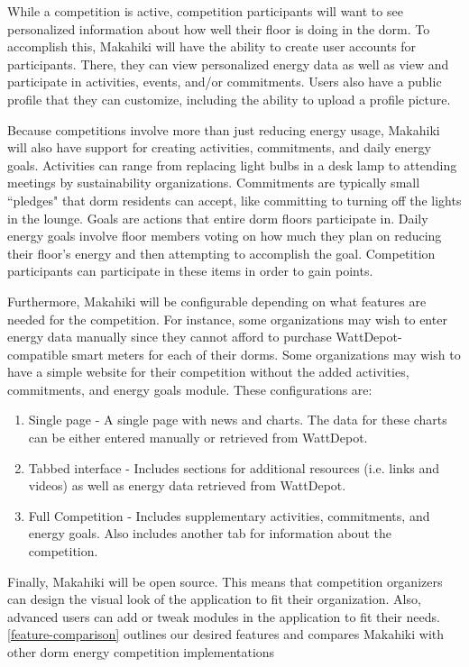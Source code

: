 While a competition is active, competition participants will want to see personalized information about how well their floor is doing in the dorm.  To accomplish this, Makahiki will have the ability to create user accounts for participants.  There, they can view personalized energy data as well as view and participate in activities, events, and/or commitments.  Users also have a public profile that they can customize, including the ability to upload a profile picture.

Because competitions involve more than just reducing energy usage, Makahiki will also have support for creating activities, commitments, and daily energy goals.  Activities can range from replacing light bulbs in a desk lamp to attending meetings by sustainability organizations.  Commitments are typically small ``pledges" that dorm residents can accept, like committing to turning off the lights in the lounge.  Goals are actions that entire dorm floors participate in.  Daily energy goals involve floor members voting on how much they plan on reducing their floor's energy and then attempting to accomplish the goal.  Competition participants can participate in these items in order to gain points.

Furthermore, Makahiki will be configurable depending on what features are needed for the competition.  For instance, some organizations may wish to enter energy data manually since they cannot afford to purchase WattDepot-compatible smart meters for each of their dorms.  Some organizations may wish to have a simple website for their competition without the added activities, commitments, and energy goals module.  These configurations are:

\begin{enumerate}
	\item Single page - A single page with news and charts.  The data for these charts can be either entered manually or retrieved from WattDepot.
	\item Tabbed interface - Includes sections for additional resources (i.e. links and videos) as well as energy data retrieved from WattDepot.
	\item Full Competition - Includes supplementary activities, commitments, and energy goals.  Also includes another tab for information about the competition.
\end{enumerate}

Finally, Makahiki will be open source.  This means that competition organizers can design the visual look of the application to fit their organization.  Also, advanced users can add or tweak modules in the application to fit their needs.  \autoref{feature-comparison} outlines our desired features and compares Makahiki with other dorm energy competition implementations

